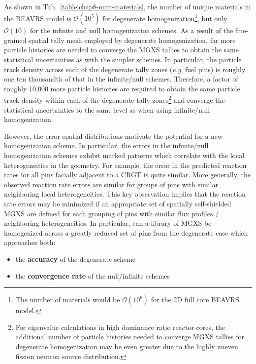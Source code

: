 As shown in Tab.~\ref{table:chap8-num-materials}, the number of unique materials in the \ac{BEAVRS} model is $\mathcal{O}(10^{5})$ for degenerate homogenization\footnote{The number of materials would be $\mathcal{O}(10^{6})$ for the 2D full core \ac{BEAVRS} model.}, but only $\mathcal{O}(10)$ for the infinite and null homogenization schemes. As a result of the fine-grained spatial tally mesh employed by degenerate homogenization, far more particle histories are needed to converge the \ac{MGXS} tallies to obtain the same statistical uncertainties as with the simpler schemes. In particular, the particle track density across each of the degenerate tally zones (\textit{e.g}, fuel pins) is roughly one ten thousandth of that in the infinite/null schemes. Therefore, a factor of roughly 10,000 more particle histories are required to obtain the same particle track density within each of the degenerate tally zones\footnote{For eigenvalue calculations in high dominance ratio reactor cores, the additional number of particle histories needed to converge \ac{MGXS} tallies for degenerate homogenization may be even greater due to the highly uneven fission neutron source distribution.} and converge the statistical uncertainties to the same level as when using infinite/null homogenization.

However, the error spatial distributions motivate the potential for a new homogenization scheme. In particular, the errors in the infinite/null homogenization schemes exhibit marked patterns which correlate with the local heterogeneities in the geometry. For example, the error in the predicted reaction rates for all pins facially adjacent to a \ac{CRGT} is quite similar. More generally, the observed reaction rate errors are similar for groups of pins with similar neighboring local heterogeneities. This key observation implies that the reaction rate errors may be minimized if an appropriate set of spatially self-shielded \ac{MGXS} are defined for each grouping of pins with similar flux profiles / neighboring heterogeneities. In particular, can a library of \ac{MGXS} be homogenized across a greatly reduced set of pins from the degenerate case which approaches both:

\begin{itemize}[noitemsep]
\item the \textbf{accuracy} of the degenerate scheme
\item the \textbf{convergence rate} of the null/infinite schemes
\end{itemize}

